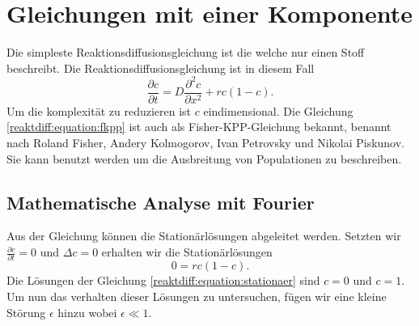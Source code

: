 %
%
%
%
\section{Gleichungen mit einer Komponente
\label{reaktdiff:section:einKomponent}}
Die simpleste Reaktionsdiffusionsgleichung ist die welche nur einen Stoff beschreibt.
Die Reaktionsdiffusionsgleichung ist in diesem Fall
\begin{equation}
\label{reaktdiff:equation:fkpp}
\frac{\partial c}{\partial t} = D \frac{\partial^2 c}{\partial x^2} + rc(1-c).
\end{equation}
Um die komplexität zu reduzieren ist \(c\) eindimensional. 
Die Gleichung \ref{reaktdiff:equation:fkpp} ist auch als Fisher-KPP-Gleichung\cite{reaktdiff:wikipedia_kpp_fisher} bekannt, benannt nach Roland Fisher, Andery Kolmogorov, Ivan Petrovsky und Nikolai Piskunov.
Sie kann benutzt werden um die Ausbreitung von Populationen zu beschreiben.

\subsection{Mathematische Analyse mit Fourier
\label{reaktdiff:subsection:fkppmathe}}
Aus der Gleichung können die Stationärlösungen abgeleitet werden.
Setzten wir \(\frac{\partial c}{\partial t} = 0\) und \(\Delta c = 0\) erhalten wir die Stationärlösungen
\begin{equation}
\label{reaktdiff:equation:stationaer}
0 = rc(1-c).
\end{equation}
Die Lösungen der Gleichung \ref{reaktdiff:equation:stationaer} sind \(c = 0\) und \(c = 1\).
Um nun das verhalten dieser Lösungen zu untersuchen, fügen wir eine kleine Störung \(\epsilon\) hinzu wobei \(\epsilon \ll 1\).

